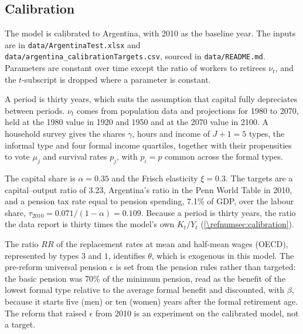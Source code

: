 \subsection{Calibration}\label{\refsec:calibration}
The model is calibrated to Argentina, with 2010 as the baseline year. The inputs are in \texttt{data/ArgentinaTest.xlsx} and \texttt{data/argentina\_calibrationTargets.csv}, sourced in \texttt{data/README.md}. Parameters are constant over time except the ratio of workers to retirees $\nu_t$, and the $t$-subscript is dropped where a parameter is constant.

A period is thirty years, which suits the assumption that capital fully depreciates between periods. $\nu_t$ comes from population data and projections for 1980 to 2070, held at the 1980 value in 1920 and 1950 and at the 2070 value in 2100. A household survey gives the shares $\gamma$, hours and income of $J+1 = 5$ types, the informal type and four formal income quartiles, together with their propensities to vote $\mu_j$ and survival rates $p_j$, with $p_i = p$ common across the formal types.

The capital share is $\alpha = 0.35$ and the Frisch elasticity $\xi = 0.3$. The targets are a capital--output ratio of 3.23, Argentina's ratio in the Penn World Table in 2010, and a pension tax rate equal to pension spending, 7.1\% of GDP, over the labour share, $\tau_{2010} = 0.071/(1-\alpha) = 0.109$. Because a period is thirty years, the ratio the data report is thirty times the model's own $K_t/Y_t$ (\cref{\refnumsec:calibration}).

The ratio $RR$ of the replacement rates at mean and half-mean wages (OECD), represented by types $3$ and $1$, identifies $\theta$, which is exogenous in this model. The pre-reform universal pension $\epsilon$ is set from the pension rules rather than targeted: the basic pension was 70\% of the minimum pension, read as the benefit of the lowest formal type relative to the average formal benefit and discounted, with $\beta$, because it starts five (men) or ten (women) years after the formal retirement age. The reform that raised $\epsilon$ from 2010 is an experiment on the calibrated model, not a target.


